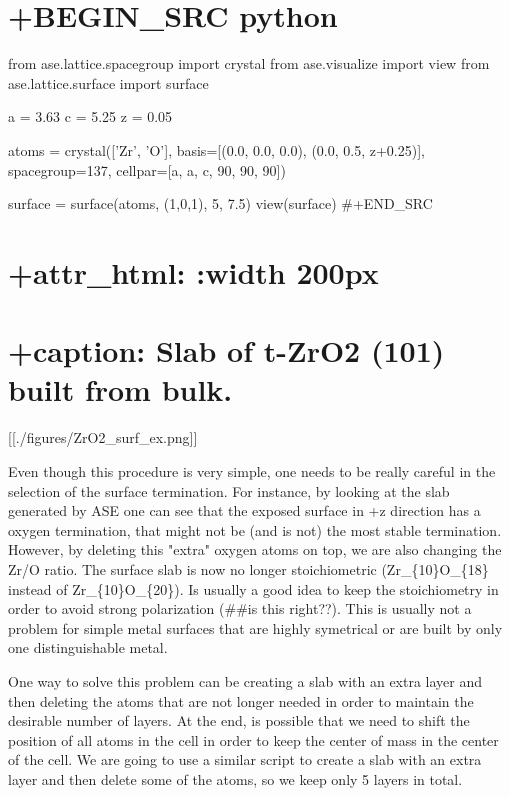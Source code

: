 \documentclass[11pt]{article}
\begin{document}
\section{+BEGIN\_SRC python}\label{begin_src-python-4}

from ase.lattice.spacegroup import crystal from ase.visualize import
view from ase.lattice.surface import surface

a = 3.63 c = 5.25 z = 0.05

atoms = crystal({[}'Zr', 'O'{]}, basis={[}(0.0, 0.0, 0.0), (0.0, 0.5,
z+0.25){]}, spacegroup=137, cellpar={[}a, a, c, 90, 90, 90{]})

surface = surface(atoms, (1,0,1), 5, 7.5) view(surface) \#+END\_SRC

\section{+attr\_html: :width 200px}\label{attr_html-width-200px}

\section{+caption: Slab of t-ZrO2 (101) built from
bulk.}\label{caption-slab-of-t-zro2-101-built-from-bulk.}

{[}{[}./figures/ZrO2\_surf\_ex.png{]}{]}

Even though this procedure is very simple, one needs to be really
careful in the selection of the surface termination. For instance, by
looking at the slab generated by ASE one can see that the exposed
surface in +z direction has a oxygen termination, that might not be (and
is not) the most stable termination. However, by deleting this "extra"
oxygen atoms on top, we are also changing the Zr/O ratio. The surface
slab is now no longer stoichiometric (Zr\_\{10\}O\_\{18\} instead of
Zr\_\{10\}O\_\{20\}). Is usually a good idea to keep the stoichiometry
in order to avoid strong polarization (\#\#is this right??). This is
usually not a problem for simple metal surfaces that are highly
symetrical or are built by only one distinguishable metal.

One way to solve this problem can be creating a slab with an extra layer
and then deleting the atoms that are not longer needed in order to
maintain the desirable number of layers. At the end, is possible that we
need to shift the position of all atoms in the cell in order to keep the
center of mass in the center of the cell. We are going to use a similar
script to create a slab with an extra layer and then delete some of the
atoms, so we keep only 5 layers in total.
\end{document}
